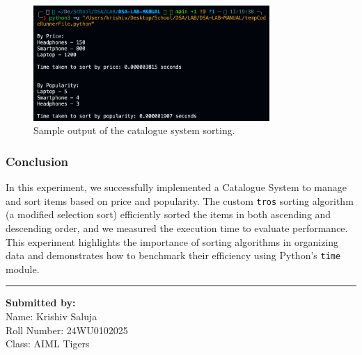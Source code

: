 \documentclass[a4paper,12pt]{article}
\begin{document}
\begin{figure}[h]
    \centering
    \includegraphics[width=0.8\textwidth]{output_screenshot_exp4.png}
    \caption{Sample output of the catalogue system sorting.}
    \label{fig:output_exp4}
\end{figure}

\subsubsection*{Conclusion}
In this experiment, we successfully implemented a Catalogue System to manage and sort items based on price and popularity. The custom \texttt{tros} sorting algorithm (a modified selection sort) efficiently sorted the items in both ascending and descending order, and we measured the execution time to evaluate performance. This experiment highlights the importance of sorting algorithms in organizing data and demonstrates how to benchmark their efficiency using Python's \texttt{time} module.

\noindent\rule{\textwidth}{1pt}
\vspace{1cm}
\begin{flushleft}
    \textbf{Submitted by:}\\
        Name: Krishiv Saluja\\
        Roll Number: 24WU0102025\\
        Class: AIML Tigers
\end{flushleft}
\end{document}
